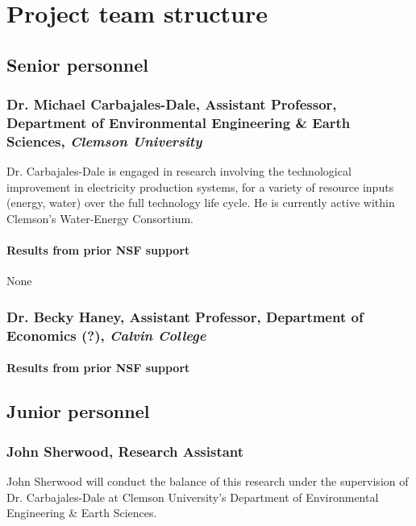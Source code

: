 \documentclass[11pt,a4paper]{article}
\begin{document}
\section{Project team structure}

\subsection{Senior personnel}


\subsubsection{Dr. Michael Carbajales-Dale, Assistant Professor, Department of Environmental Engineering \& Earth Sciences, \emph{Clemson University}}

Dr. Carbajales-Dale is engaged in research involving the technological improvement in electricity production systems, for a variety of resource inputs (energy, water) over the full technology life cycle. He is currently active within Clemson's Water-Energy Consortium. 


\paragraph{Results from prior NSF support}

None

\subsubsection{Dr. Becky Haney, Assistant Professor, Department of Economics (?), \emph{Calvin College}}

\paragraph{Results from prior NSF support}


\subsection{Junior personnel}

\subsubsection{John Sherwood, Research Assistant}

John Sherwood will conduct the balance of this research under the supervision of Dr. Carbajales-Dale at Clemson University's Department of Environmental Engineering \& Earth Sciences.
\end{document}
